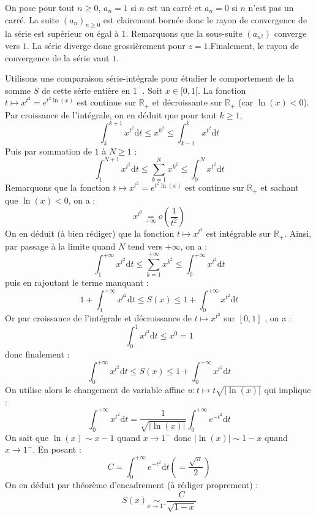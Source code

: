 \documentclass[a4paper,twoside,french,11pt]{VcCours}
\newcommand{\dt}{\text{d}t}
\begin{document}
\begin{corr} On pose pour tout $n \geq 0$, $a_n=1$ si $n$ est un carré et $a_n =0$ si $n$ n'est pas un carré. La suite $(a_n)_{n \geq 0}$ est clairement bornée donc le rayon de convergence de la série est supérieur ou égal à $1$. Remarquons que la sous-suite $(a_{n^2})$ converge vers $1$. La série diverge donc grossièrement pour $z=1$.Finalement, le rayon de convergence de la série vaut $1$.



Utilisons une comparaison série-intégrale pour étudier le comportement de la somme $S$ de cette série entière en $1^{-}$. Soit $x \in [0,1[$. La fonction $t \mapsto x^{t^2} = e^{t^2 \ln(x)}$ est continue sur $\mathbb{R}_+$ et décroissante sur $\mathbb{R}_+$ (car $\ln(x)<0$). Par croissance de l'intégrale, on en déduit que pour tout $k \geq 1$,
$$ \int_{k}^{k+1} x^{t^2} \dt \leq x^{k^2} \leq \int_{k-1}^{k} x^{t^2} \dt$$
Puis par sommation de $1$ à $N \geq 1$ :
$$ \int_{1}^{N+1} x^{t^2} \dt \leq \sum_{k=1}^N x^{k^2} \leq \int_{0}^{N} x^{t^2} \dt$$
Remarquons que la fonction $t \mapsto x^{t^2} = e^{t^2 \ln(x)}$ est continue sur $\mathbb{R}_+$ et sachant que $\ln(x)<0$, on a :
$$ x^{t^2} \underset{+ \infty}{=} o \left( \dfrac{1}{t^2} \right)$$
On en déduit (à bien rédiger) que la fonction $t \mapsto x^{t^2}$ est intégrable sur $\mathbb{R}_+$. Ainsi, par passage à la limite quand $N$ tend vers $+ \infty$, on a :
$$  \int_{1}^{+ \infty} x^{t^2} \dt \leq \sum_{k=1}^{+ \infty} x^{k^2} \leq \int_{0}^{+ \infty} x^{t^2} \dt$$
puis en rajoutant le terme manquant :
$$ 1+  \int_{1}^{+ \infty} x^{t^2} \dt \leq S(x) \leq 1+ \int_{0}^{+ \infty} x^{t^2} \dt$$
Or par croissance de l'intégrale et décroissance de $t \mapsto x^{t^2}$ sur $[0,1]$ , on a :
$$ \int_{0}^{1} x^{t^2} \dt \leq x^{0} =1$$
donc finalement :
$$\int_{0}^{+ \infty} x^{t^2} \dt \leq S(x) \leq 1+ \int_{0}^{+ \infty} x^{t^2} \dt$$
On utilise alors le changement de variable affine  $u : t \mapsto t \sqrt{\vert \ln(x) \vert}$ qui implique :
$$ \int_{0}^{+ \infty} x^{t^2} \dt = \dfrac{1}{\sqrt{\vert \ln(x) \vert}} \int_{0}^{+ \infty} e^{-t^2} \dt$$
On sait que $\ln(x) \sim x-1$ quand $x \rightarrow 1^{-}$ donc $\vert \ln(x) \vert \sim 1-x$ quand $x \rightarrow 1^{-}$. En posant :
$$ C =  \int_{0}^{+ \infty} e^{-t^2} \dt \left( = \dfrac{\sqrt{\pi}}{2} \right)$$
On en déduit par théorème d'encadrement (à rédiger proprement) :
$$S(x) \underset{x \rightarrow 1^{-}}{\sim} \dfrac{C}{\sqrt{1-x}}$$
\end{corr}
\end{document}
